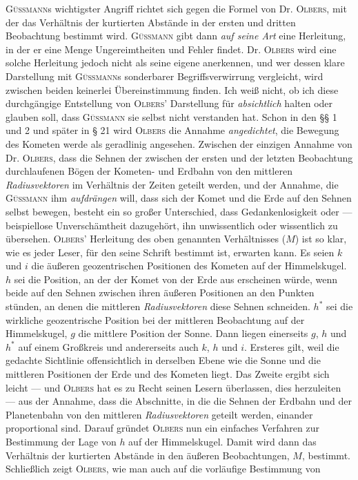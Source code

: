 \textsc{Güssmann}s wichtigster Angriff richtet sich gegen die Formel von Dr. \textsc{Olbers}, mit der das Verhältnis der kurtierten Abstände in der ersten und dritten Beobachtung bestimmt wird. \textsc{Güssmann} gibt dann \emph{auf seine Art} eine Herleitung, in der er eine Menge Ungereimtheiten und Fehler findet. Dr. \textsc{Olbers} wird eine solche Herleitung jedoch nicht als seine eigene anerkennen, und wer dessen klare Darstellung mit \textsc{Güssmann}s sonderbarer Begriffsverwirrung vergleicht, wird zwischen beiden keinerlei Übereinstimmung finden. Ich weiß nicht, ob ich diese durchgängige Entstellung von \textsc{Olbers}’ Darstellung für \emph{absichtlich} halten oder glauben soll, dass \textsc{Güssmann} sie selbst nicht verstanden hat. Schon in den §§ 1 und 2 und später in § 21 wird \textsc{Olbers} die Annahme \emph{angedichtet}, die Bewegung des Kometen werde als geradlinig angesehen. Zwischen der einzigen Annahme von Dr. \textsc{Olbers}, dass die Sehnen der zwischen der ersten und der letzten Beobachtung durchlaufenen Bögen der Kometen- und Erdbahn von den mittleren \emph{Radiusvektoren} im Verhältnis der Zeiten geteilt werden, und der Annahme, die \textsc{Güssmann} ihm \emph{aufdrängen} will, dass sich der Komet und die Erde auf den Sehnen selbst bewegen, besteht ein so großer Unterschied, dass Gedankenlosigkeit oder — beispiellose Unverschämtheit dazugehört, ihn unwissentlich oder wissentlich zu übersehen. \textsc{Olbers}’ Herleitung des oben genannten Verhältnisses ($M$) ist so klar, wie es jeder Leser, für den seine Schrift bestimmt ist, erwarten kann. Es seien $k$ und $i$ die äußeren geozentrischen Positionen des Kometen auf der Himmelskugel. $h$ sei die Position, an der der Komet von der Erde aus erscheinen würde, wenn beide auf den Sehnen zwischen ihren äußeren Positionen an den Punkten stünden, an denen die mittleren \emph{Radiusvektoren} diese Sehnen schneiden. $h^*$ sei die wirkliche geozentrische Position bei der mittleren Beobachtung auf der Himmelskugel, $g$ die mittlere Position der Sonne. Dann liegen einerseits $g$, $h$ und $h^*$ auf einem Großkreis und andererseits auch $k$, $h$ und $i$. Ersteres gilt, weil die gedachte Sichtlinie offensichtlich in derselben Ebene wie die Sonne und die mittleren Positionen der Erde und des Kometen liegt. Das Zweite ergibt sich leicht — und \textsc{Olbers} hat es zu Recht seinen Lesern überlassen, dies herzuleiten — aus der Annahme, dass die Abschnitte, in die die Sehnen der Erdbahn und der Planetenbahn von den mittleren \emph{Radiusvektoren} geteilt werden, einander proportional sind. Darauf gründet \textsc{Olbers} nun ein einfaches Verfahren zur Bestimmung der Lage von $h$ auf der Himmelskugel. Damit wird dann das Verhältnis der kurtierten Abstände in den äußeren Beobachtungen, $M$, bestimmt. Schließlich zeigt \textsc{Olbers}, wie man auch auf die vorläufige Bestimmung von
